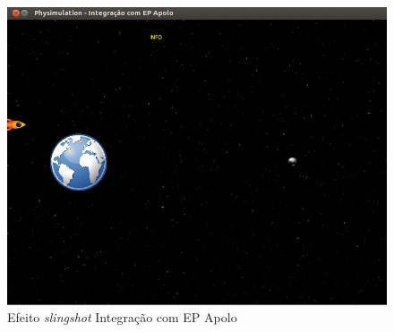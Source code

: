 \begin{figure}[H]
	\includegraphics[scale=0.22]{images/apolo-5.png}
	\caption{Efeito \textit{slingshot} Integração com EP Apolo}
\end{figure}


